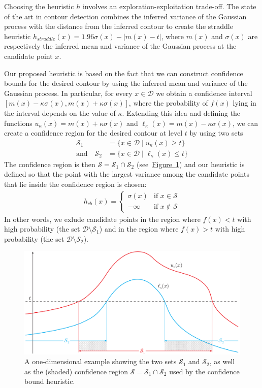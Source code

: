 \documentclass[11pt]{article} %
\newcommand{\figref}[1]{\hyperref[#1]{\mbox{Figure~\ref*{#1}}}}
\newcommand{\twopartdef}[4]
{
	\left\{
		\begin{array}{ll}
			#1 & \mbox{if } #2 \\
			#3 & \mbox{if } #4
		\end{array}
	\right.
}
\begin{document}
Choosing the heuristic $h$ involves an exploration-exploitation trade-off. The
state of the art in contour detection combines the inferred variance of the
Gaussian process with the
distance from the inferred contour to create the straddle~\cite{bryan2005}
heuristic ${h_{straddle}(x) = 1.96\sigma(x) - | m(x) - t |}$, where $m(x)$
and $\sigma(x)$ are respectively the inferred mean and variance of the Gaussian
process at the candidate point $x$.

Our proposed heuristic is based on the fact that we can construct confidence
bounds for the desired contour by using the inferred mean and variance of
the Gaussian process. In particular, for every $x \in \mathcal{D}$ we obtain
a confidence interval ${[m(x) - \kappa\sigma(x), m(x) + \kappa\sigma(x)]}$,
where the probability of $f(x)$ lying in the interval depends on the value
of $\kappa$. Extending this idea and defining the functions
$u_{\kappa}(x) = m(x) + \kappa\sigma(x)$ and
$\ell_{\kappa}(x) = m(x) - \kappa\sigma(x)$,
we can create a confidence region for
the desired contour at level $t$ by using two sets
\begin{align*}
  \mathcal{S}_1 &= \{x \in \mathcal{D} \mid u_{\kappa}(x) \geq t\}\\
  \text{and}\hspace{1em}
  \mathcal{S}_2 &= \{x \in \mathcal{D} \mid \ell_{\kappa}(x) \leq t\}
\end{align*}
The confidence region is then
$\mathcal{S} = \mathcal{S}_1\cap\mathcal{S}_2$ (see~\figref{fig:cb}) and our
heuristic is defined
so that the point with the largest variance among the candidate points that
lie inside the confidence region is chosen:
\begin{align}\label{eq:hcb}
  h_{cb}(x) = \twopartdef { \sigma(x) } {x \in \mathcal{S}} {-\infty} {x \notin \mathcal{S}}
\end{align}
In other words, we exlude candidate points in the region where
$f(x) < t$ with high probability (the set $\mathcal{D}\setminus\mathcal{S}_1$)
and in the region where $f(x) > t$ with high probability
(the set $\mathcal{D}\setminus\mathcal{S}_2$).

\begin{figure}[tb]
  \centering
  \includegraphics[width=\textwidth]{figures/cb}
  \caption{A one-dimensional example showing the two sets $\mathcal{S}_1$ and
           $\mathcal{S}_2$, as well as the (shaded) confidence region
           $\mathcal{S} = \mathcal{S}_1\cap\mathcal{S}_2$ used by the confidence
           bound heuristic.}
  \label{fig:cb}
\end{figure}
\end{document}
